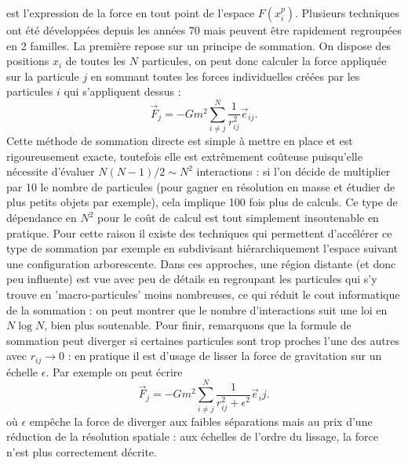  est l'expression de la force en tout point de l'espace ${F}(x_i^p)$. Plusieurs techniques ont été développées depuis les années 70 mais peuvent être rapidement regroupées en 2 familles. La première repose sur un principe de sommation. On dispose des positions $x_i$ de toutes les $N$ particules, on peut donc calculer la force appliquée sur la particule $j$ en sommant toutes les forces individuelles créées par les particules $i$ qui s'appliquent dessus  :
\begin{equation}
\vec F_j=-Gm^2\sum_{i\neq j} ^N\frac{1}{r_{ij}^2}\vec e_{ij}. 
\end{equation}
Cette méthode de sommation directe est simple à mettre en place et est rigoureusement exacte, toutefois elle est extrêmement coûteuse puisqu'elle nécessite d'évaluer $N(N-1)/2 \sim N^2$ interactions : si l'on décide de multiplier par 10 le nombre de particules (pour gagner en résolution en masse et étudier de plus petits objets par exemple), cela implique 100 fois plus de calculs. Ce type de dépendance en $N^2$ pour le coût de calcul est tout simplement insoutenable en pratique. Pour cette raison il existe des techniques qui permettent d'accélérer ce type de sommation par exemple en subdivisant hiérarchiquement l'espace suivant une configuration arborescente. Dans ces approches, une région distante (et donc peu influente) est vue avec peu de détails en regroupant les particules qui s'y trouve en 'macro-particules' moins nombreuses, ce qui réduit le cout informatique de la sommation : on peut montrer que le nombre d'interactions suit une loi en $N\log N$, bien plus soutenable. Pour finir, remarquons que la formule de sommation peut diverger si certaines particules sont trop proches l'une des autres avec $r_{ij}\rightarrow 0$ : en pratique il est d'usage de lisser la force de gravitation sur un échelle $\epsilon$. Par exemple on peut écrire
\begin{equation}
\vec F_j=-Gm^2\sum_{i\neq j} ^N\frac{1}{r_{ij}^2+\epsilon^2}\vec e_ij. 
\end{equation}
où $\epsilon$ empêche la force de diverger aux faibles séparations mais au prix d'une réduction de la résolution spatiale : aux échelles de l'ordre du lissage, la force n'est plus correctement décrite.

